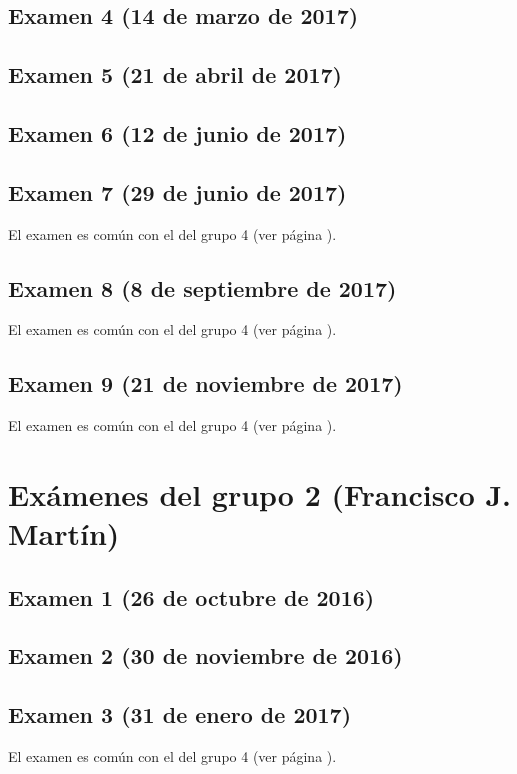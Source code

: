 \documentclass[a4paper,12pt,twoside]{book}
\begin{document}
\subsection{Examen 4 (14 de marzo de 2017)}
\subsection{Examen 5 (21 de abril de 2017)}
\subsection{Examen 6 (12 de junio de 2017)} 
 \label{examen_16_17_1_6}
\subsection{Examen 7 (29 de junio de 2017)}
El examen es común con el del grupo 4 (ver página \pageref{examen_16_17_4_7}).
\subsection{Examen 8 (8 de septiembre de 2017)}
El examen es común con el del grupo 4 (ver página \pageref{examen_16_17_4_8}).
\subsection{Examen 9 (21 de noviembre de 2017)}
El examen es común con el del grupo 4 (ver página \pageref{examen_16_17_4_9}).

\section{Exámenes del grupo 2 (Francisco J. Martín)}
\subsection{Examen 1 (26 de octubre de 2016)}
\subsection{Examen 2 (30 de noviembre de 2016)}
\subsection{Examen 3 (31 de enero de 2017)}
El examen es común con el del grupo 4 (ver página \pageref{examen_16_17_4_3}).
\end{document}

